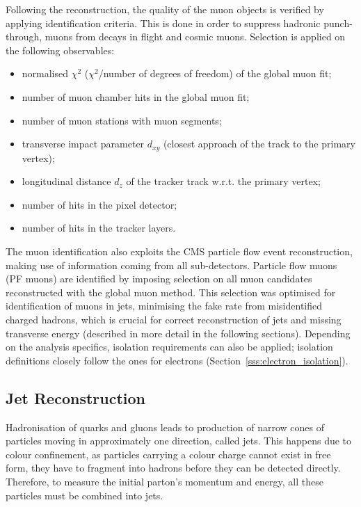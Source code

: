 Following the reconstruction, the quality of the muon objects is verified by applying identification criteria. This is
done in order to suppress hadronic punch-through, muons from decays in flight and cosmic muons. Selection is applied on
the following observables:
\begin{itemize}
  \item normalised $\chi^2$ ($\chi^2$/number of degrees of freedom) of the global muon fit;
  \item number of muon chamber hits in the global muon fit;
  \item number of muon stations with muon segments;
  \item transverse impact parameter $d_{xy}$ (closest approach of the track to the primary vertex);
  \item longitudinal distance $d_z$ of the tracker track w.r.t. the primary vertex;
  \item number of hits in the pixel detector;
  \item number of hits in the tracker layers.
\end{itemize}

The muon identification also exploits the CMS particle flow event reconstruction, making use of information coming from
all sub-detectors. Particle flow muons (PF muons) are identified by imposing selection on all muon candidates
reconstructed with the global muon method. This selection was optimised for identification of muons in jets, minimising
the fake rate from misidentified charged hadrons, which is crucial for correct reconstruction of jets and missing
transverse energy (described in more detail in the following sections). Depending on the analysis specifics, isolation
requirements can also be applied; isolation definitions closely follow the ones for electrons
(Section~\ref{sss:electron_isolation}).


\subsection{Jet Reconstruction}
\label{ss:jet_reconstruction}
Hadronisation of quarks and gluons leads to production of narrow cones of particles moving in approximately one
direction, called jets. This happens due to colour confinement, as particles carrying a colour charge cannot exist in
free form, they have to fragment into hadrons before they can be detected directly. Therefore, to measure the initial
parton's momentum and energy, all these particles must be combined into jets.

